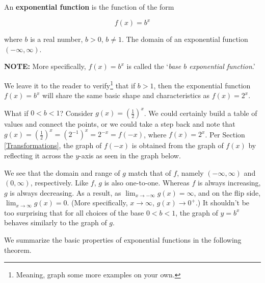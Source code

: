 \documentclass{ximera}
\begin{document}

\begin{definition} \label{expfcndefn}    An \textbf{exponential function} is the function of the form


\[ f(x) = b^{x}\]

 where $b$ is a  real number, $b > 0$, $b \neq 1$.   The domain of an exponential function  $(-\infty, \infty)$.
 
 \textbf{NOTE:}  More specifically, $f(x) = b^{x}$ is called the `\textit{base $b$ exponential function}.'
\end{definition}



 

We leave it to the reader to verify\footnote{Meaning, graph some more examples on your own.} that if $b > 1$, then the exponential function $f(x) = b^{x}$ will share the same basic shape and characteristics as $f(x) = 2^{x}$.  

 

What if $0 < b < 1$?  Consider $g(x) = \left(\frac{1}{2}\right)^{x}$.  We could certainly build a table of values and connect the points, or we could take a step back and note that $g(x) = \left(\frac{1}{2}\right)^{x} = \left(2^{-1}\right)^{x} = 2^{-x} = f(-x)$, where $f(x) = 2^{x}$.  Per Section \ref{Transformations}, the graph of $f(-x)$ is obtained from the graph of $f(x)$ by reflecting it across the $y$-axis as seen in the graph below. 


\begin{center}
\end{center}

We see that the domain and range of $g$ match that of $f$, namely $(-\infty, \infty)$ and $(0,\infty)$, respectively. Like $f$, $g$ is also one-to-one.  Whereas $f$ is always increasing, $g$ is always decreasing.  As a result, as $\lim_{x \rightarrow -\infty} g(x)  = \infty$, and on the flip side, $\lim_{x \rightarrow \infty} g(x) = 0$. (More specifically, $x \rightarrow \infty$, $g(x) \rightarrow 0^{+}$.)  It shouldn't be too surprising that for all choices of the base $0 < b < 1$, the graph of $y=b^{x}$ behaves similarly to the graph of $g$.  

 

We summarize the basic properties of exponential functions in the following theorem.
\end{document}
